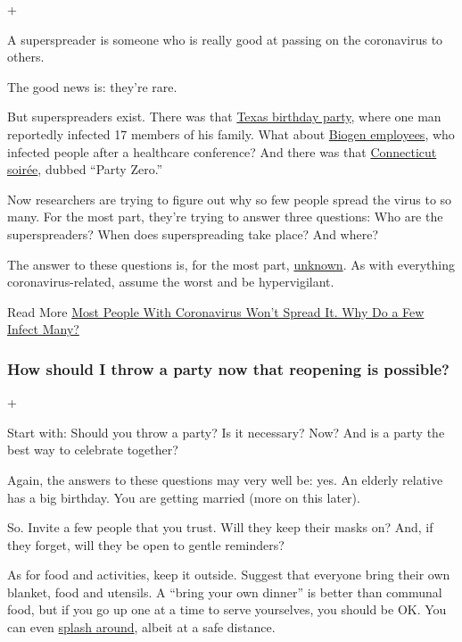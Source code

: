 +

A superspreader is someone who is really good at passing on the
coronavirus to others.

The good news is: they're rare.

But superspreaders exist. There was that
\href{https://apnews.com/d9a6ca7eef083315648003509d07515a}{Texas
birthday party}, where one man reportedly infected 17 members of his
family. What about
\href{https://www.nytimes3xbfgragh.onion/2020/04/12/us/coronavirus-biogen-boston-superspreader.html}{Biogen
employees}, who infected people after a healthcare conference? And there
was that
\href{https://www.nytimes3xbfgragh.onion/2020/03/23/us/coronavirus-westport-connecticut-party-zero.html}{Connecticut
soirée}, dubbed ``Party Zero.''

Now researchers are trying to figure out why so few people spread the
virus to so many. For the most part, they're trying to answer three
questions: Who are the superspreaders? When does superspreading take
place? And where?

The answer to these questions is, for the most part,
\href{https://www.nytimes3xbfgragh.onion/2020/06/30/science/how-coronavirus-spreads.html}{unknown}.
As with everything coronavirus-related, assume the worst and be
hypervigilant.

Read More
\href{https://www.nytimes3xbfgragh.onion/2020/06/30/science/how-coronavirus-spreads.html}{Most
People With Coronavirus Won't Spread It. Why Do a Few Infect Many?}

\hypertarget{how-should-i-throw-a-party-now-that-reopening-is-possible}{%
\subsubsection{How should I throw a party now that reopening is
possible?}\label{how-should-i-throw-a-party-now-that-reopening-is-possible}}

+

Start with: Should you throw a party? Is it necessary? Now? And is a
party the best way to celebrate together?

Again, the answers to these questions may very well be: yes. An elderly
relative has a big birthday. You are getting married (more on this
later).

So. Invite a few people that you trust. Will they keep their masks on?
And, if they forget, will they be open to gentle reminders?

As for food and activities, keep it outside. Suggest that everyone bring
their own blanket, food and utensils. A ``bring your own dinner'' is
better than communal food, but if you go up one at a time to serve
yourselves, you should be OK. You can even
\href{https://www.nytimes3xbfgragh.onion/2020/06/06/at-home/coronavirus-cool-off-even-without-a-deep-end.html}{splash
around}, albeit at a safe distance.


